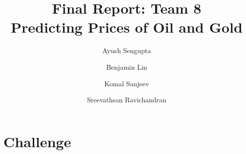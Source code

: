 \documentclass[runningheads]{llncs}
\newcommand{\keywords}[1]{\par\addvspace\baselineskip
\noindent\keywordname\enspace\ignorespaces#1}
\newcommand{\swallow}[1]{ }
\begin{document}
\mainmatter  %

\title{Final Report: Team 8\\
Predicting Prices of Oil and Gold}


%
%
\author{Ayush Sengupta \and Benjamin Lin \and Komal Sanjeev \and Sreevathsan Ravichandran}
%


%
%

\maketitle

\swallow{   %
\begin{abstract}
The abstract should summarize the contents of the paper and should
contain at least 70 and at most 150 words. It should be written using the
\emph{abstract} environment.
\keywords{We would like to encourage you to list your keywords within
the abstract section}
\end{abstract}
}


\section{Challenge} 
\end{document}
